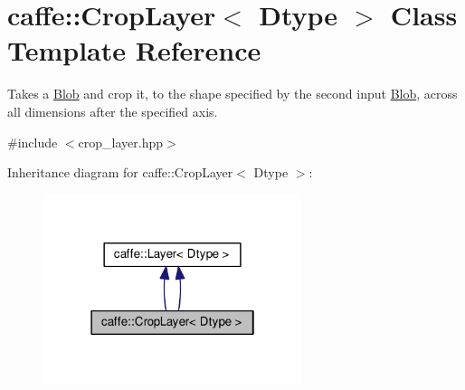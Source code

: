 \hypertarget{classcaffe_1_1_crop_layer}{}\section{caffe\+:\+:Crop\+Layer$<$ Dtype $>$ Class Template Reference}
\label{classcaffe_1_1_crop_layer}


Takes a \mbox{\hyperlink{classcaffe_1_1_blob}{Blob}} and crop it, to the shape specified by the second input \mbox{\hyperlink{classcaffe_1_1_blob}{Blob}}, across all dimensions after the specified axis.  




{\ttfamily \#include $<$crop\+\_\+layer.\+hpp$>$}



Inheritance diagram for caffe\+:\+:Crop\+Layer$<$ Dtype $>$\+:
\nopagebreak
\begin{figure}[H]
\begin{center}
\leavevmode
\includegraphics[width=214pt]{classcaffe_1_1_crop_layer__inherit__graph}
\end{center}
\end{figure}

